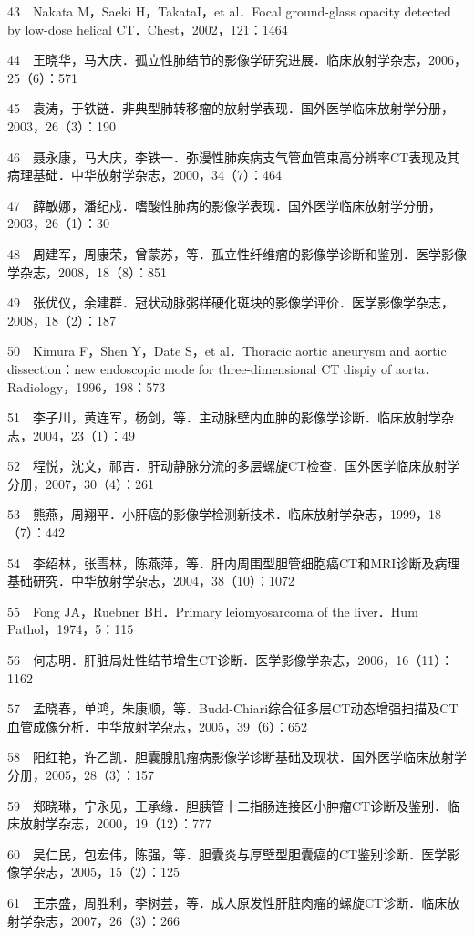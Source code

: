 43　Nakata M，Saeki H，TakataI，et al．Focal ground-glass opacity
detected by low-dose helical CT．Chest，2002，121：1464

44　王晓华，马大庆．孤立性肺结节的影像学研究进展．临床放射学杂志，2006，25（6）：571

45　袁涛，于铁链．非典型肺转移瘤的放射学表现．国外医学临床放射学分册，2003，26（3）：190

46　聂永康，马大庆，李铁一．弥漫性肺疾病支气管血管束高分辨率CT表现及其病理基础．中华放射学杂志，2000，34（7）：464

47　薛敏娜，潘纪戍．嗜酸性肺病的影像学表现．国外医学临床放射学分册，2003，26（1）：30

48　周建军，周康荣，曾蒙苏，等．孤立性纤维瘤的影像学诊断和鉴别．医学影像学杂志，2008，18（8）：851

49　张优仪，余建群．冠状动脉粥样硬化斑块的影像学评价．医学影像学杂志，2008，18（2）：187

50　Kimura F，Shen Y，Date S，et al．Thoracic aortic aneurysm and aortic
dissection：new endoscopic mode for three-dimensional CT dispiy of
aorta．Radiology，1996，198：573

51　李子川，黄连军，杨剑，等．主动脉壁内血肿的影像学诊断．临床放射学杂志，2004，23（1）：49

52　程悦，沈文，祁吉．肝动静脉分流的多层螺旋CT检查．国外医学临床放射学分册，2007，30（4）：261

53　熊燕，周翔平．小肝癌的影像学检测新技术．临床放射学杂志，1999，18（7）：442

54　李绍林，张雪林，陈燕萍，等．肝内周围型胆管细胞癌CT和MRI诊断及病理基础研究．中华放射学杂志，2004，38（10）：1072

55　Fong JA，Ruebner BH．Primary leiomyosarcoma of the liver．Hum
Pathol，1974，5：115

56　何志明．肝脏局灶性结节增生CT诊断．医学影像学杂志，2006，16（11）：1162

57　孟晓春，单鸿，朱康顺，等．Budd-Chiari综合征多层CT动态增强扫描及CT血管成像分析．中华放射学杂志，2005，39（6）：652

58　阳红艳，许乙凯．胆囊腺肌瘤病影像学诊断基础及现状．国外医学临床放射学分册，2005，28（3）：157

59　郑晓琳，宁永见，王承缘．胆胰管十二指肠连接区小肿瘤CT诊断及鉴别．临床放射学杂志，2000，19（12）：777

60　吴仁民，包宏伟，陈强，等．胆囊炎与厚壁型胆囊癌的CT鉴别诊断．医学影像学杂志，2005，15（2）：125

61　王宗盛，周胜利，李树芸，等．成人原发性肝脏肉瘤的螺旋CT诊断．临床放射学杂志，2007，26（3）：266

